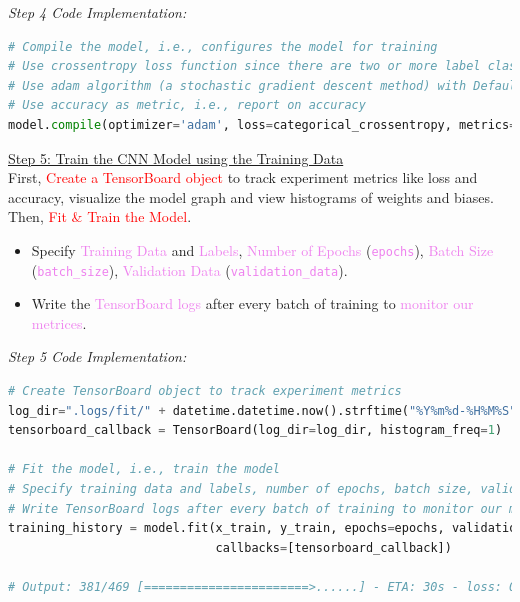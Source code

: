\documentclass{book}
\begin{document}
\vspace{1mm}
\textit{\large Step 4 Code Implementation:}\\
\begin{lstlisting}[language=Python, basicstyle=\ttfamily\small, keywordstyle=\color{blue}, commentstyle=\color{forestgreen}, stringstyle=\color{red}, showstringspaces=false]
# Compile the model, i.e., configures the model for training
# Use crossentropy loss function since there are two or more label classes.
# Use adam algorithm (a stochastic gradient descent method) with Default learning rate = 0.001
# Use accuracy as metric, i.e., report on accuracy
model.compile(optimizer='adam', loss=categorical_crossentropy, metrics=['accuracy'])
\end{lstlisting}
\uline{Step 5: Train the CNN Model using the Training Data}\\
\vspace{1mm}
First, \textcolor{red}{Create a TensorBoard object} to track experiment metrics like loss and accuracy, visualize the model graph and view histograms of weights and biases.\\
Then, \textcolor{red}{Fit \& Train the Model}.
\begin{itemize}
    \item Specify \textcolor{violet}{Training Data} and \textcolor{violet}{Labels}, \textcolor{violet}{Number of Epochs} (\textcolor{violet}{\texttt{epochs}}), \textcolor{violet}{Batch Size} (\textcolor{violet}{\texttt{batch\_size}}), \textcolor{violet}{Validation Data} (\textcolor{violet}{\texttt{validation\_data}}).
    \item Write the \textcolor{violet}{TensorBoard logs} after every batch of training to \textcolor{violet}{monitor our metrices}.
\end{itemize}
\textit{\large{Step 5 Code Implementation:}}
\begin{lstlisting}[language=Python, basicstyle=\ttfamily\small, keywordstyle=\color{blue}, commentstyle=\color{forestgreen}, stringstyle=\color{red}, showstringspaces=false]
# Create TensorBoard object to track experiment metrics
log_dir=".logs/fit/" + datetime.datetime.now().strftime("%Y%m%d-%H%M%S")
tensorboard_callback = TensorBoard(log_dir=log_dir, histogram_freq=1)

# Fit the model, i.e., train the model
# Specify training data and labels, number of epochs, batch size, validation data
# Write TensorBoard logs after every batch of training to monitor our metrices
training_history = model.fit(x_train, y_train, epochs=epochs, validation_data=(x_test, y_test),
                             callbacks=[tensorboard_callback])   

# Output: 381/469 [=======================>......] - ETA: 30s - loss: 0.8187 - accuracy: 0.8545
\end{lstlisting}
\end{document}
